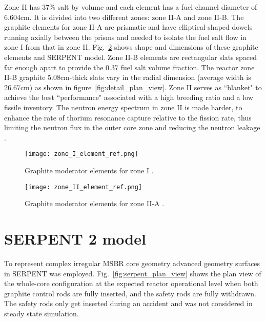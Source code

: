 Zone II has 37\% salt by volume and each element has a fuel channel 
diameter of 6.604cm. It is divided into two different zones: zone II-A and zone 
II-B. The graphite elements for zone II-A are prismatic and have elliptical-shaped dowels running axially between the prisms and needed to isolate the fuel salt flow in zone I from that in zone II. Fig.~\ref{fig:II_element_ref} shows shape and dimensions of these graphite elements and SERPENT model. Zone II-B elements are rectangular slats spaced far enough apart to provide the 0.37 fuel salt volume fraction. The reactor zone II-B graphite 5.08cm-thick slats vary in the radial dimension (average width is 26.67cm) as shown in figure~\ref{fig:detail_plan_view}. Zone II serves as ``blanket" to achieve the best ``performance" associated with a high breeding ratio and a low fissile inventory. The neutron energy spectrum in zone II is made harder, to enhance the rate of thorium resonance capture relative to the fission rate, thus limiting the neutron flux in the outer core zone and reducing the neutron leakage \cite{robertson_conceptual_1971}. 

\begin{figure}[hbp!] %
  \centering
  \vspace{-0.3em}
  \texttt{[image: zone\_I\_element\_ref.png]}
  \caption{Graphite moderator elements for zone I \cite{robertson_conceptual_1971,rykhlevskii_full-core_2017}.}
  \vspace{-0.6em}
  \label{fig:I_element_ref}
\end{figure}
\FloatBarrier

\begin{figure}[hbp!] %
  \centering
  \vspace{-0.3em}
  \texttt{[image: zone\_II\_element\_ref.png]}
  \caption{Graphite moderator elements for zone II-A \cite{robertson_conceptual_1971,rykhlevskii_full-core_2017}.}
  \vspace{-0.6em}
  \label{fig:II_element_ref}
\end{figure}
\FloatBarrier

\section{SERPENT 2 model}

To represent complex irregular \gls{MSBR} core geometry advanced geometry surfaces in SERPENT was employed. Fig.~\ref{fig:serpent_plan_view} shows the plan view of the whole-core configuration at the expected reactor operational level when both graphite control rods are fully inserted, and the safety rods are fully withdrawn. The safety rods only get inserted during an accident and was not considered in steady state simulation. 

